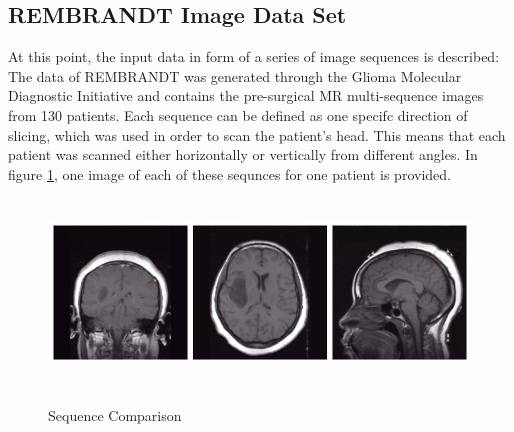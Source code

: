 \documentclass[twoside,11pt]{article}
\begin{document}
\subsection{REMBRANDT Image Data Set}
At this point, the input data in form of a series of image sequences is described: 
The data of REMBRANDT was generated through the Glioma Molecular Diagnostic Initiative and contains the pre-surgical MR multi-sequence images from 130 patients. Each sequence can be defined as one specifc direction of slicing, which was used in order to scan the patient's head. This means that each patient was scanned either  horizontally or vertically from different angles. In figure \ref{fig:sequences}, one image of each of these sequnces for one patient is provided.

\begin{figure}{\textwidth}
	\label{fig:sequences}
	\centering
	\includegraphics[height=5cm]{sequences}
	\caption{Sequence Comparison}
\end{figure}%



\end{document}

